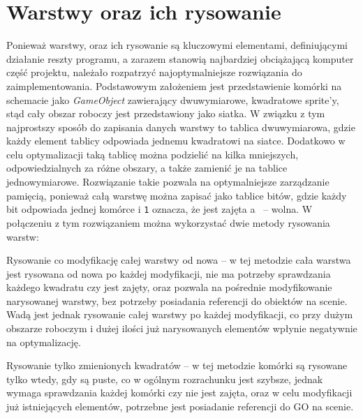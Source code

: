 \section{Warstwy oraz ich rysowanie}
\label{sec:warstwy_oraz_ich_rysowanie}

Ponieważ warstwy, oraz ich rysowanie są kluczowymi elementami, definiującymi działanie reszty programu,
a zarazem stanowią najbardziej obciążającą komputer część projektu,
należało rozpatrzyć najoptymalniejsze rozwiązania do zaimplementowania.
Podstawowym założeniem jest przedstawienie komórki na schemacie jako \textit{GameObject} zawierający dwuwymiarowe,
kwadratowe sprite'y,
stąd cały obszar roboczy jest przedstawiony jako siatka.
W związku z tym najprostszy sposób do zapisania danych warstwy to tablica dwuwymiarowa,
gdzie każdy element tablicy odpowiada jednemu kwadratowi na siatce.
Dodatkowo w celu optymalizacji taką tablicę można podzielić na kilka mniejszych,
odpowiedzialnych za różne obszary, a także zamienić je na tablice jednowymiarowe.
Rozwiązanie takie pozwala na optymalniejsze zarządzanie pamięcią,
ponieważ całą warstwę można zapisać jako tablice bitów,
gdzie każdy bit odpowiada jednej komórce i \texttt{1} oznacza,
że jest zajęta a~ -- wolna.
W połączeniu z tym rozwiązaniem można wykorzystać dwie metody rysowania warstw:

\begin{citemize}
    \item Rysowanie co modyfikację całej warstwy od nowa -- w tej metodzie cała warstwa jest rysowana od nowa po każdej modyfikacji,
    nie ma potrzeby sprawdzania każdego kwadratu czy jest zajęty, oraz pozwala na pośrednie modyfikowanie narysowanej warstwy,
    bez potrzeby posiadania referencji do obiektów na scenie.
    Wadą jest jednak rysowanie całej warstwy po każdej modyfikacji,
    co przy dużym obszarze roboczym i dużej ilości już narysowanych elementów wpłynie negatywnie na optymalizację.
    \item Rysowanie tylko zmienionych kwadratów -- w tej metodzie komórki są rysowane tylko wtedy, gdy są puste,
    co w ogólnym rozrachunku jest szybsze, jednak wymaga sprawdzania każdej komórki czy nie jest zajęta,
    oraz w celu modyfikacji już istniejących elementów, potrzebne jest posiadanie referencji do GO na scenie.
\end{citemize}

